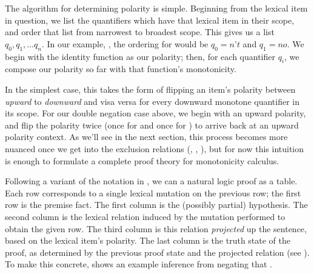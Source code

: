 The algorithm for determining polarity is simple.
Beginning from the lexical item in question, we list the quantifiers which have that lexical item
  in their scope, and order that list from narrowest to broadest scope.
This gives us a list $q_0, q_1, \dots q_n$.
In our example, , the ordering for  would be
  $q_0=\textit{n't}$ and $q_1=\textit{no}$.
We begin with the identity function as our polarity;
  then, for each quantifier $q_i$, we compose our polarity so far with
  that function's monotonicity.

In the simplest case, this takes the form of flipping an item's polarity between \textit{upward}
  to \textit{downward} and visa versa for every downward monotone quantifier in its scope.
For our double negation case above, we begin with an upward polarity, and flip the polarity twice
  (once for  and once for ) to arrive back at an upward polarity context.
As we'll see in the next section, this process becomes more nuanced once we get into the exclusion
  relations (\alternate, \negate, \cover), but for now this intuition is enough to formulate
  a complete proof theory for monotonicity calculus.

Following a variant of the notation in , we can a natural logic
  proof as a table.
Each row corresponds to a single lexical mutation on the previous row; the first row is the
  premise fact.
The first column is the (possibly partial) hypothesis.
The second column is the lexical relation induced by the mutation performed to obtain the given
  row.
The third column is this relation \textit{projected} up the sentence, based on the lexical item's
  polarity.
The last column is the truth state of the proof, as determined by the previous proof state and the
  projected relation (see ).
To make this concrete,  shows an example inference
  from  negating that .

